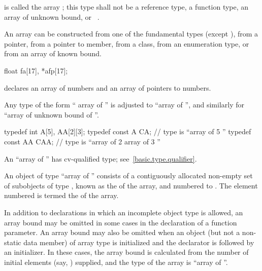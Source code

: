 \pnum
{} is called the array ;
this type shall not be
a reference type,
a function type,
an array of unknown bound, or
\cv{}~.
\begin{note}
An array can be constructed
from one of the fundamental types (except ),
from a pointer,
from a pointer to member,
from a class,
from an enumeration type,
or from an array of known bound.
\end{note}
\begin{example}
\begin{codeblock}
float fa[17], *afp[17];
\end{codeblock}
declares an array of  numbers and
an array of pointers to  numbers.
\end{example}

\pnum
Any type of the form
`` array of  ''
is adjusted to
``array of   '',
and similarly for ``array of unknown bound of ''.
\begin{example}
\begin{codeblock}
typedef int A[5], AA[2][3];
typedef const A CA;             // type is ``array of 5 ''
typedef const AA CAA;           // type is ``array of 2 array of 3 ''
\end{codeblock}
\end{example}
\begin{note}
An ``array of   ''
has cv-qualified type; see~\ref{basic.type.qualifier}.
\end{note}

\pnum
An object of type ``array of  '' consists of
a contiguously allocated non-empty set
of  subobjects of type ,
known as the  of the array,
and numbered  to .
The element numbered  is termed
the  of the array.

\pnum
In addition to declarations in which an incomplete object type is allowed,
an array bound may be omitted in some cases in the declaration of a function
parameter.
An array bound may also be omitted
when an object (but not a non-static data member) of array type is initialized
and the declarator is followed by
an initializer.
%
In these cases, the array bound is calculated
from the number of initial elements (say, )
supplied,
and the type of the array is ``array of  ''.

